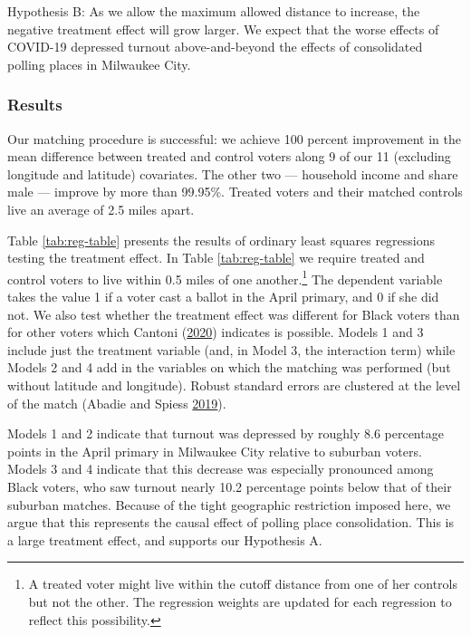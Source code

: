 \documentclass[
  12pt,
]{article}
\begin{document}
Hypothesis B: As we allow the maximum allowed distance to increase, the negative treatment effect will grow larger. We expect that the worse effects of COVID-19 depressed turnout above-and-beyond the effects of consolidated polling places in Milwaukee City.

\hypertarget{results}{%
\subsubsection*{Results}\label{results}}

Our matching procedure is successful: we achieve 100 percent improvement in the mean difference between treated and control voters along 9 of our 11 (excluding longitude and latitude) covariates. The other two --- household income and share male --- improve by more than 99.95\%. Treated voters and their matched controls live an average of 2.5 miles apart.

Table \ref{tab:reg-table} presents the results of ordinary least squares regressions testing the treatment effect. In Table \ref{tab:reg-table} we require treated and control voters to live within 0.5 miles of one another.\footnote{A treated voter might live within the cutoff distance from one of her controls but not the other. The regression weights are updated for each regression to reflect this possibility.} The dependent variable takes the value 1 if a voter cast a ballot in the April primary, and 0 if she did not. We also test whether the treatment effect was different for Black voters than for other voters which Cantoni (\protect\hyperlink{ref-Cantoni2020}{2020}) indicates is possible. Models 1 and 3 include just the treatment variable (and, in Model 3, the interaction term) while Models 2 and 4 add in the variables on which the matching was performed (but without latitude and longitude). Robust standard errors are clustered at the level of the match (Abadie and Spiess \protect\hyperlink{ref-Abadie2019}{2019}).

\begin{singlespace}


\end{singlespace}

Models 1 and 2 indicate that turnout was depressed by roughly 8.6 percentage points in the April primary in Milwaukee City relative to suburban voters. Models 3 and 4 indicate that this decrease was especially pronounced among Black voters, who saw turnout nearly 10.2 percentage points below that of their suburban matches. Because of the tight geographic restriction imposed here, we argue that this represents the causal effect of polling place consolidation. This is a large treatment effect, and supports our Hypothesis A.
\end{document}
